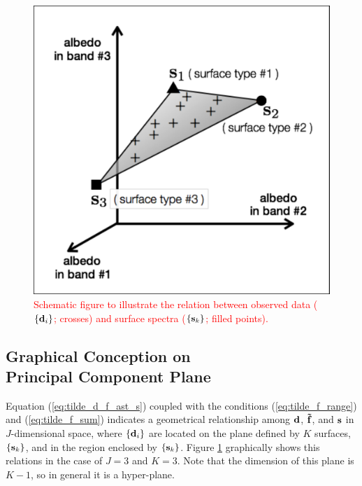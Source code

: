 \documentclass[iop,numberedappendix,apj]{emulateapj}
\def\fast{\tilde f}
\def\edit#1{\textcolor{red}{#1}}
\def\memoYF#1{\color{red}[YF: {\bf #1}]\color{black}}
\begin{document}
\begin{figure}[b!]
    \begin{center}
\includegraphics[width=\hsize]{schematics_ver2.pdf}
    \end{center}
    \caption{\edit{Schematic figure to illustrate the relation between observed data ($\{{\bf d}_i\} $; crosses) and surface spectra ($\{{\bf s}_k\} $; filled points). }}
\label{fig:schematic}
\end{figure}


\subsection{Graphical Conception on \\Principal Component Plane}
\label{ss:PCplane}


Equation (\ref{eq:tilde_d_f_ast_s}) coupled with the conditions (\ref{eq:tilde_f_range}) and (\ref{eq:tilde_f_sum}) indicates a geometrical relationship among ${\bf d}$, ${\bf \fast }$, and ${\bf s}$ in 
$J$-dimensional space, where $\{{\bf d}_i\}$ are located on the plane defined by $K$ surfaces, $\{{\bf s}_k\} $, and in the region enclosed by $\{{\bf s}_k\} $. 
Figure \ref{fig:schematic} graphically shows this relations in the case of $J=3$ and $K=3$. 
Note that the dimension of this plane is $K-1$, so in general it is a hyper-plane.  
\end{document}
